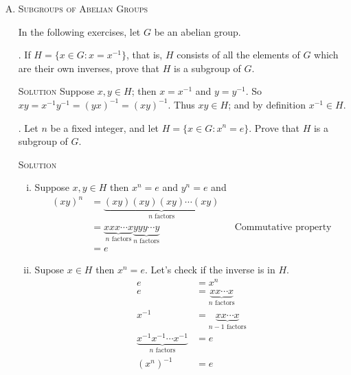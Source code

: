 \documentclass[twoside]{amsart}
\newcommand{\solution}{\textsc{Solution}\xspace}
\newcommand{\problem}{\textsc{Problem}\xspace}
\begin{document}
\begin{enumerate}[A.]
\begin{enumerate}[(i)]
      \item Suppose $f \in H$; then $[-f](x) = -f(x)$, and
      $d(-f)/dx = -df/dx = -k$. Thus, $-f \in H$.
   \end{enumerate}

   . \problem $G=\langle \mathcal{F}(\mathbb{R}),+\rangle,\, H =
   \{ f \in \mathcal{F}(\mathbb{R}) : f(x) \in \mathbb{Z}$ for every
   $x \in \mathbb{R}\}$.

   \noindent \solution 
   \begin{enumerate}[(i)]
      \item Suppose $f,g \in H$; then $f(x)\in\mathbb{Z}$ and
      $g(x)\in\mathbb{Z}$ for every $x\in\mathbb{R}$. So
      $[f+g](x)=f(x)+g(x)$ and $f(x)+g(x) \in \mathbb{Z}$ for every
      $x \in \mathbb{R}$.

      \item Suppose $f \in H$; then $[-f](x)=-f(x)$. But $-f(x) \in 
      \mathbb{Z}$ for every $x \in \mathbb{R}$.
   \end{enumerate}

   \item \textsc{Subgroups of Abelian Groups}

   \noindent In the following exercises, let $G$ be an abelian group.

   . If $H=\{x \in G : x = x^{-1}\}$, that is, $H$ consists of
   all the elements of $G$ which are their own inverses, prove that $H$
   is a subgroup of $G$.

   \noindent \solution Suppose $x,y \in H$; then $x=x^{-1}$ and $y=y^{-1}$.
   So $xy = x^{-1}y^{-1} = (yx)^{-1} = (xy)^{-1}$. Thus $xy \in H$; and
   by definition $x^{-1} \in H$.

   . Let $n$ be a fixed integer, and let $H=\{x \in G
   : x^n = e\}$. Prove that $H$ is a subgroup of $G$.

   \noindent \solution 
   \begin{enumerate}[(i)]
      \item Suppose $x,y\in H$ then $x^n=e$ and $y^n=e$ and
	 \begin{align*}
	 (xy)^n & = \underbrace{(xy)(xy)(xy)\cdots (xy)}_{n \text{ factors}}\\
	        & = \underbrace{xxx\cdots x}_{n\text{ factors}}
		    \underbrace{yyy\cdots y}_{n\text{ factors}}
		    && \text{Commutative property} \\
		& = e
	 \end{align*}
      \item Supose $x\in H$ then $x^n = e$. Let's check if the inverse is
      in $H$.  
      \begin{align*}
          e & = x^n \\
	  e & = \underbrace{xx\cdots x}_{n\text{ factors}} \\
	  x^{-1} & = \underbrace{xx\cdots x}_{n-1\text{ factors}}\\
	  \underbrace{x^{-1}x^{-1}\cdots x^{-1}}_{n\text{ factors}} & = e \\
	  (x^n)^{-1} & = e
      \end{align*}


\end{enumerate}
\end{enumerate}
\end{document}
